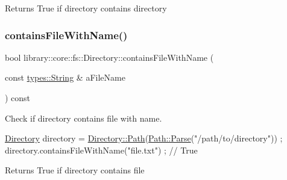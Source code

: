 \begin{DoxyReturn}{Returns}
True if directory contains directory 
\end{DoxyReturn}
\mbox{\label{classlibrary_1_1core_1_1fs_1_1_directory_a0d326fef28dfbb21702a12af9701ed50}} 
\subsubsection{\texorpdfstring{contains\+File\+With\+Name()}{containsFileWithName()}}
{\footnotesize\ttfamily bool library\+::core\+::fs\+::\+Directory\+::contains\+File\+With\+Name (\begin{DoxyParamCaption}\item[{const \hyperlink{classlibrary_1_1core_1_1types_1_1_string}{types\+::\+String} \&}]{a\+File\+Name }\end{DoxyParamCaption}) const}



Check if directory contains file with name. 


\begin{DoxyCode}
\hyperlink{classlibrary_1_1core_1_1fs_1_1_directory_a3ec39f6cad19a81d520e9a1f2d8bb1f7}{Directory} directory = \hyperlink{classlibrary_1_1core_1_1fs_1_1_directory_a6d3ea04654841e62a4dbd99feb563caf}{Directory::Path}(\hyperlink{classlibrary_1_1core_1_1fs_1_1_path_a6ba644b6609507e724c217bf2020f5ae}{Path::Parse}(\textcolor{stringliteral}{"/path/to/directory"}))
       ;
directory.containsFileWithName(\textcolor{stringliteral}{"file.txt"}) ; \textcolor{comment}{// True}
\end{DoxyCode}


\begin{DoxyReturn}{Returns}
True if directory contains file 
\end{DoxyReturn}
\mbox{\label{classlibrary_1_1core_1_1fs_1_1_directory_a7d1bd71d46c8fd653cf237dc3ed5aa00}} 
